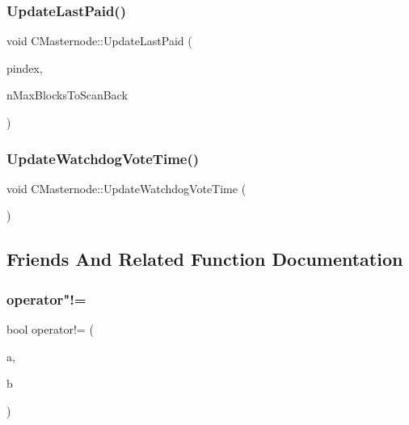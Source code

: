 \mbox{\label{class_c_masternode_ade5a3726f6da526f616045f58a7b5857}} 
\subsubsection{\texorpdfstring{Update\+Last\+Paid()}{UpdateLastPaid()}}
{\footnotesize\ttfamily void C\+Masternode\+::\+Update\+Last\+Paid (\begin{DoxyParamCaption}\item[{const \mbox{\hyperlink{class_c_block_index}{C\+Block\+Index}} $\ast$}]{pindex,  }\item[{int}]{n\+Max\+Blocks\+To\+Scan\+Back }\end{DoxyParamCaption})}

\mbox{\label{class_c_masternode_a8ef654deadd035f7e4cf786bd38369bb}} 
\subsubsection{\texorpdfstring{Update\+Watchdog\+Vote\+Time()}{UpdateWatchdogVoteTime()}}
{\footnotesize\ttfamily void C\+Masternode\+::\+Update\+Watchdog\+Vote\+Time (\begin{DoxyParamCaption}{ }\end{DoxyParamCaption})}



\subsection{Friends And Related Function Documentation}
\mbox{\label{class_c_masternode_ab717eb8dbdf0438855bd30eb922fe73a}} 
\subsubsection{\texorpdfstring{operator"!=}{operator!=}}
{\footnotesize\ttfamily bool operator!= (\begin{DoxyParamCaption}\item[{const \mbox{\hyperlink{class_c_masternode}{C\+Masternode}} \&}]{a,  }\item[{const \mbox{\hyperlink{class_c_masternode}{C\+Masternode}} \&}]{b }\end{DoxyParamCaption})\hspace{0.3cm}{\ttfamily [friend]}}

